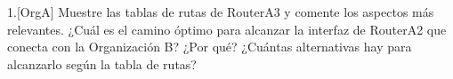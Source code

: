 \begin{ejer}
1.[OrgA] Muestre las tablas de rutas de RouterA3 y comente los aspectos más relevantes. ¿Cuál es el camino óptimo para alcanzar la interfaz de RouterA2 que conecta con la Organización B? ¿Por qué? ¿Cuántas alternativas hay para alcanzarlo según la tabla de rutas?
\end{ejer}
